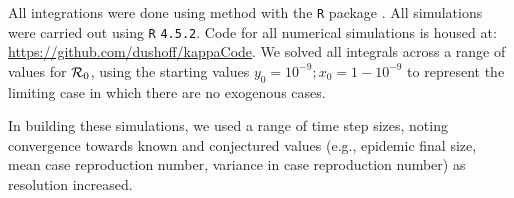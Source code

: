  All integrations were done using  method with the \texttt{R} package .
  All simulations were carried out using \texttt{R} \texttt{4.5.2}.
    Code for all numerical simulations is housed at: \url{https://github.com/dushoff/kappaCode}.   
We solved all integrals across a range of values for ${\mathcal R}_{\mathrm{0}}$, using the starting values $y_0 = 10^{-9}; x_0 = 1-10^{-9}$  to represent the limiting case in which there are no exogenous cases.

 In building these simulations, we used a range of time step sizes, noting convergence towards known and conjectured values (e.g., epidemic final size, mean case reproduction number, variance in case reproduction number) as resolution increased. 
